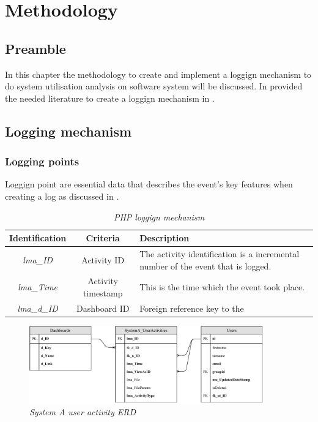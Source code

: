 \chapter{Methodology}
\label{chap:2}

\section{Preamble}
In this chapter the methodology to create and implement a loggign mechanism to do system utilisation analysis on software system will be discussed. In  provided the needed literature to create a loggign mechanism in .

\section{Logging mechanism}\label{sec:Ch3_LoggingMechanism}

\subsection{Logging points}
Loggign point are essential data that describes the event's key features when creating a log as discussed in .

\begin{table}[!htb]
	\centering
	\small
	\caption[Loggign points]
	{\textit{PHP loggign mechanism}}
	\label{tbl:PHP_LoggignMechanism}
	\begin{tabularx}{\textwidth}{|c|c|X|}
		\hline \textbf{Identification} & \textbf{Criteria} & \textbf{Description} \\
        \hline \textit{lma\_ID} & Activity ID & The activity identification is a incremental number of the event that is logged.\\
        \hline \textit{lma\_Time} & Activity timestamp & This is the time which the event took place.\\
        \hline \textit{lma\_d\_ID} & Dashboard ID & Foreign reference key to the  \\
		\hline
	\end{tabularx}
\end{table}

\begin{figure}[!htb] %
	\centering %
	\includegraphics[width=0.9\textwidth]{Images/Chapter2/SystemA_ERD_Basic/SystemA_ERD_Basic.pdf}
	\caption[System A user activity ERD]
	{\textit{System A user activity ERD}} \label{fig:SystemA_Basic_ERD}
\end{figure}

